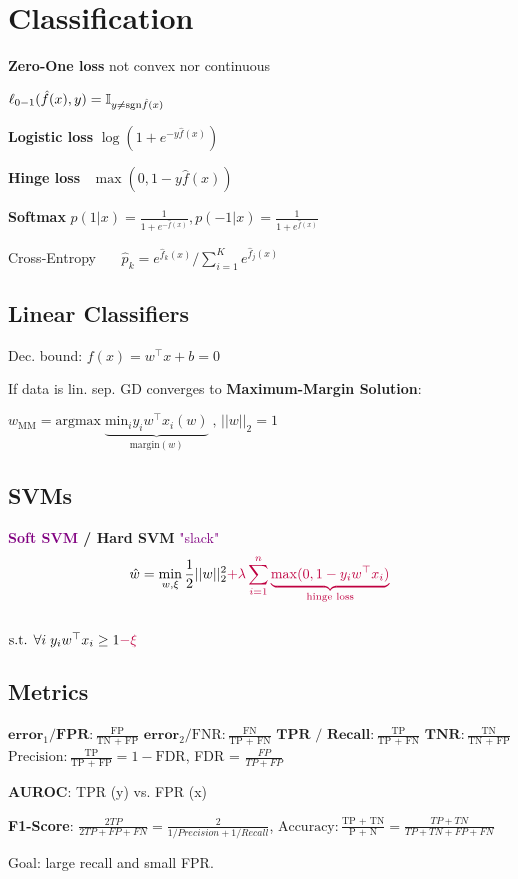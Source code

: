 \section*{Classification}

\textbf{Zero-One loss} \quad not convex nor continuous

\qquad \qquad $\ell_{0-1}(\hat{f}(x), y) = \mathbb{I}_{y \neq \text{sgn} \hat{f}(x)}$

\textbf{Logistic loss} \quad $\log(1 + e^{-y \hat{f}(x)})$

\textbf{Hinge loss} \quad \ $\max(0, 1-y \hat{f}(x))$

\textbf{Softmax} $p(1 | x) = \frac{1}{1 + e^{- \hat{f}(x)}}, p(-1 | x) = \frac{1}{1 + e^{\hat{f}(x)}}$ 

Cross-Entropy \ \ \ $\hat{p}_k = e^{\hat{f}_k(x)} / \sum_{i=1}^K e^{\hat{f}_j(x)}$

\subsection*{Linear Classifiers}

Dec. bound: $f(x) = w^\top x + b  = 0$

If data is lin. sep. GD  converges to \textbf{Maximum-Margin Solution}: 

$w_{\text{MM}} = \text{argmax} \; \underbrace{\text{min}_i y_i w^\top x_i (w)}_{\text{margin}(w)} \; \text{, } ||w||_2 = 1$ \\[-15pt]
 
\subsection*{SVMs}
 
\textbf{\textcolor{purple}{Soft SVM} / Hard SVM} \quad \textcolor{purple}{"slack"} 
$$\hat{w} = \min_{w, \xi} \frac{1}{2} ||w||_2^2 \textcolor{purple}{ + \lambda \sum_{i=1}^n \underbrace{\max (0, 1 - y_i w^\top x_i)}_{\text{hinge loss}}}$$ \\[-10pt]
$\text{s.t. } \forall i \;y_i w^\top x_i \geq 1 \textcolor{purple}{- \xi}$ 

\subsection*{Metrics} 
$\textbf{error}_1 / \textbf{FPR}: \frac{\text{FP}}{\text{TN + FP}}$
$\textbf{error}_2 / \text{FNR}: \frac{\text{FN}}{\text{TP + FN}}$
$\textbf{TPR / Recall}: \frac{\text{TP}}{\text{TP + FN}}$
$\textbf{TNR}: \frac{\text{TN}}{\text{TN + FP}}$
$\text{Precision}: \frac{\text{TP}}{\text{TP + FP}} = 1 - \text{FDR}$, FDR = $\frac{FP}{TP + FP}$

\textbf{AUROC}: TPR (y) vs. FPR (x)

\textbf{F1-Score}: $\frac{2TP}{2TP+FP+FN}=\frac{2}{1/Precision+1/Recall}$, $\text{Accuracy}: \frac{\text{TP + TN}}{\text{P + N}} = \frac{TP + TN}{TP + TN + FP + FN}$

Goal: large recall and small FPR.
